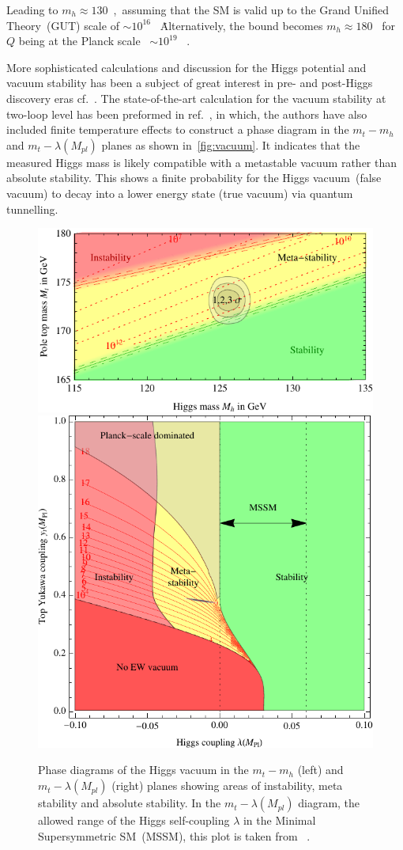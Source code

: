 Leading to $ m_h \approx 130$\ \GeV,\ assuming that the SM is valid up to the Grand Unified Theory~(GUT) scale of $ \sim 10^{16}$ \ \GeV \. Alternatively, the bound becomes $ m_h \approx 180$ \GeV \ for $Q$ being at the Planck scale ~$ \sim 10^{19}$ \ \GeV . 
\par More sophisticated calculations and discussion for the Higgs potential and vacuum stability has been a subject of great interest in pre- and post-Higgs discovery eras cf.~\cite{Lindner:1985uk,Sher:1988mj,Casas:1996aq,Isidori:2001bm}.  The  state-of-the-art calculation for the vacuum stability at two-loop level has been preformed in ref.~\cite{Degrassi:2012ry}, in which, the authors have also included finite temperature effects to construct a phase diagram in the $m_t-m_h$  and $m_t-\lambda(M_{pl})$ planes as shown in~\autoref{fig:vacuum}.  
It indicates that the measured Higgs mass is likely compatible with a metastable vacuum rather than absolute stability. This shows a finite probability for the Higgs vacuum~(false vacuum) to decay into a lower energy state (true vacuum) via quantum tunnelling.
\begin{figure}[t!]
	\begin{center}
		\includegraphics[height=0.32\textwidth]{figures/deadoraliveG2012}
		\includegraphics[height=0.32\textwidth]{figures/Ath}
		\caption{Phase diagrams of the Higgs vacuum in the $m_t-m_h$ (left) and  $m_t-\lambda(M_{pl})$ (right) planes showing areas of instability, meta stability and absolute stability. In the  $m_t-\lambda(M_{pl})$ diagram, the allowed range of the Higgs self-coupling $\lambda$ in the Minimal Supersymmetric SM~(MSSM), this plot is taken from ~\cite{Degrassi:2012ry}. }
		\label{fig:vacuum}
	\end{center}
\end{figure}

